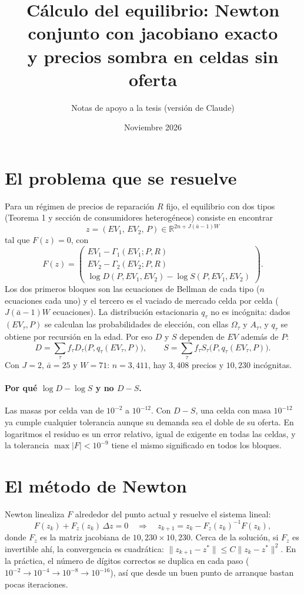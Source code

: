 \documentclass{article}
\title{Cálculo del equilibrio: Newton conjunto con jacobiano exacto\\ y precios sombra en celdas sin oferta}
\author{Notas de apoyo a la tesis (versión de Claude)}
\date{Noviembre 2026}
\begin{document}
\maketitle

\section{El problema que se resuelve}

Para un régimen de precios de reparación $R$ fijo, el equilibrio con dos tipos (Teorema 1 y
sección de consumidores heterogéneos) consiste en encontrar
$$z=(EV_1,\,EV_2,\,P)\in\mathbb{R}^{2n+J(\bar a-1)W}$$
tal que $F(z)=0$, con
$$F(z)=\begin{pmatrix}
EV_1-\Gamma_1(EV_1;P,R)\\[2pt]
EV_2-\Gamma_2(EV_2;P,R)\\[2pt]
\log D(P,EV_1,EV_2)-\log S(P,EV_1,EV_2)
\end{pmatrix}.$$
Los dos primeros bloques son las ecuaciones de Bellman de cada tipo ($n$ ecuaciones cada uno) y
el tercero es el vaciado de mercado celda por celda ($J(\bar a-1)W$ ecuaciones). La distribución
estacionaria $q_\tau$ no es incógnita: dados $(EV_\tau,P)$ se calculan las probabilidades de
elección, con ellas $\Omega_\tau$ y $A_\tau$, y $q_\tau$ se obtiene por recursión en
la edad. Por eso $D$ y $S$ dependen de $EV$ además de $P$:
$$D=\sum_\tau f_\tau D_\tau\big(P,q_\tau(EV_\tau,P)\big),\qquad
S=\sum_\tau f_\tau S_\tau\big(P,q_\tau(EV_\tau,P)\big).$$
Con $J=2$, $\bar a=25$ y $W=71$: $n=3{,}411$, hay $3{,}408$ precios y $10{,}230$ incógnitas.

\paragraph{Por qué $\log D-\log S$ y no $D-S$.} Las masas por celda van de $10^{-2}$ a $10^{-12}$.
Con $D-S$, una celda con masa $10^{-12}$ ya cumple cualquier tolerancia aunque su demanda sea
el doble de su oferta. En logaritmos el residuo es un error relativo, igual de exigente en todas
las celdas, y la tolerancia $\max|F|<10^{-9}$ tiene el mismo significado en todos los bloques.

\section{El método de Newton}

Newton linealiza $F$ alrededor del punto actual y resuelve el sistema lineal:
$$F(z_k)+F_z(z_k)\,\Delta z=0\quad\Longrightarrow\quad
z_{k+1}=z_k-F_z(z_k)^{-1}F(z_k),$$
donde $F_z$ es la matriz jacobiana de $10{,}230\times10{,}230$. Cerca de la solución, si $F_z$ es
invertible ahí, la convergencia es cuadrática: $\|z_{k+1}-z^*\|\le C\|z_k-z^*\|^2$. En la práctica,
el número de dígitos correctos se duplica en cada paso ($10^{-2}\to10^{-4}\to10^{-8}\to10^{-16}$), así que
desde un buen punto de arranque bastan pocas iteraciones.
\end{document}
